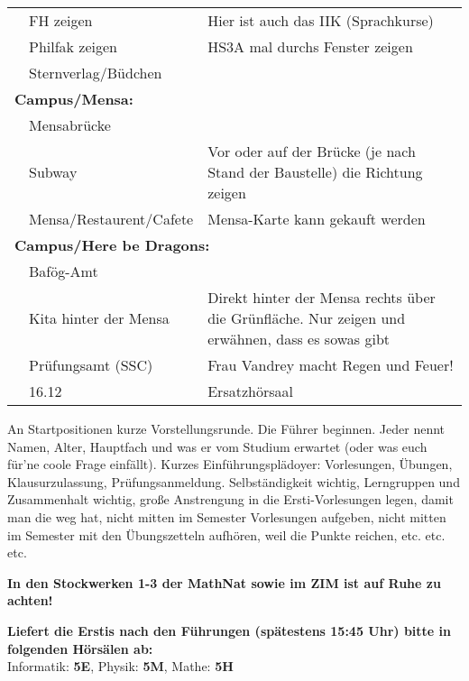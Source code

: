 \documentclass[a4paper,10pt]{article}
\newcounter{magicrownumbers}[page]
\newcommand\rownumber{\stepcounter{magicrownumbers}\arabic{magicrownumbers}}
\newcommand{\pretext}{An Startpositionen kurze Vorstellungsrunde. Die Führer beginnen. Jeder nennt Namen, Alter, Hauptfach
und was er vom Studium erwartet (oder was euch für'ne coole Frage einfällt). Kurzes
Einführungsplädoyer: Vorlesungen, Übungen, Klausurzulassung, Prüfungsanmeldung. Selbständigkeit
wichtig, Lerngruppen und Zusammenhalt wichtig, große
Anstrengung in die Ersti-Vorlesungen legen, damit man die weg hat, nicht mitten im Semester
Vorlesungen aufgeben, nicht mitten im Semester mit den Übungszetteln aufhören, weil die Punkte
reichen, etc. etc. etc.

\textbf{In den Stockwerken 1-3 der MathNat sowie im ZIM ist auf Ruhe zu achten!}

\textbf{Liefert die Erstis nach den Führungen (spätestens 15:45 Uhr) bitte in folgenden Hörsälen ab:}\\
Informatik: \textbf{5E}, Physik: \textbf{5M}, Mathe: \textbf{5H}\\}
\begin{document}
\begin{tabularx}{\textwidth}{p{}p{}p{}}
  \rownumber & FH zeigen & Hier ist auch das IIK (Sprachkurse) \\
  \rownumber & Philfak zeigen & HS3A mal durchs Fenster zeigen \\
  \rownumber & Sternverlag/Büdchen & \\
  \hline
  \multicolumn{3}{l}{\large{\textbf{Campus/Mensa:}}} \\
  \rownumber & Mensabrücke & \\
  \rownumber & Subway &  Vor oder auf der Brücke (je nach Stand der Baustelle) die Richtung zeigen\\
  \rownumber & Mensa/Restaurent/Cafete & Mensa-Karte kann gekauft werden \\
  \hline
  \multicolumn{3}{l}{\large{\textbf{Campus/Here be Dragons:}}} \\
  \rownumber & Bafög-Amt & \\
  \rownumber & Kita hinter der Mensa & Direkt hinter der Mensa rechts über die Grünfläche. Nur
  zeigen und erwähnen, dass es sowas gibt \\
  \rownumber & Prüfungsamt (SSC) & Frau Vandrey macht Regen und Feuer!\\
  \rownumber & 16.12 & Ersatzhörsaal \\
\end{tabularx}
\newpage
\pretext
\end{document}
